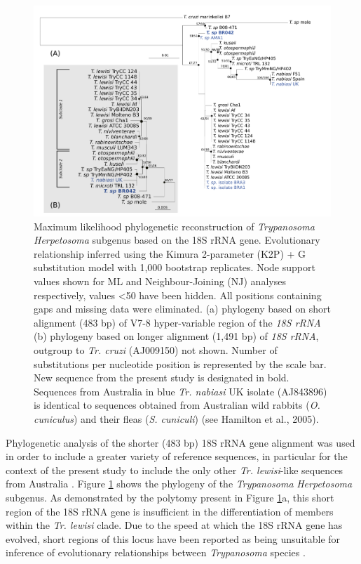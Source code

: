 \documentclass[a4paper, nobind]{templates/ociamthesis}
\begin{document}
\begin{figure}
\includegraphics[width=0.95\linewidth]{figures/ms-figs/Ch5-Fig1} \caption[Phylogeny of \textit{Trypanosoma Herpetosoma} subgenus based on the 18S rRNA gene.]{Maximum likelihood phylogenetic reconstruction of \textit{Trypanosoma Herpetosoma} subgenus based on the 18S rRNA gene. Evolutionary relationship inferred using the Kimura 2-parameter (K2P) + G substitution model with 1,000 bootstrap replicates. Node support values shown for ML and Neighbour-Joining (NJ) analyses respectively, values <50 have been hidden. All positions containing gaps and missing data were eliminated. (a) phylogeny based on short alignment (483 bp) of V7-8 hyper-variable region of the \textit{18S rRNA} (b) phylogeny based on longer alignment (1,491 bp) of \textit{18S rRNA}, outgroup to \textit{Tr. cruzi} (AJ009150) not shown. Number of substitutions per nucleotide position is represented by the scale bar. New sequence from the present study is designated in bold. Sequences from Australia in blue \textit{Tr. nabiasi} UK isolate (AJ843896) is identical to sequences obtained from Australian wild rabbits (\textit{O. cuniculus}) and their fleas (\textit{S. cuniculi}) (see Hamilton et al., 2005).}\label{fig:F51}
\end{figure}

Phylogenetic analysis of the shorter (483 bp) 18S rRNA gene alignment was used in order to include a greater variety of reference sequences, in particular for the context of the present study to include the only other \emph{Tr. lewisi}-like sequences from Australia \autocite{hamiltonInadvertentIntroductionAustralia2005,averisDiversityDistributionHostparasite2009}. Figure \ref{fig:F51} shows the phylogeny of the \emph{Trypanosoma} \emph{Herpetosoma} subgenus. As demonstrated by the polytomy present in Figure \ref{fig:F51}a, this short region of the 18S rRNA gene is insufficient in the differentiation of members within the \emph{Tr. lewisi} clade. Due to the speed at which the 18S rRNA gene has evolved, short regions of this locus have been reported as being unsuitable for inference of evolutionary relationships between \emph{Trypanosoma} species \autocite{hamiltonResolvingRelationshipsAustralian2011}.
\end{document}
